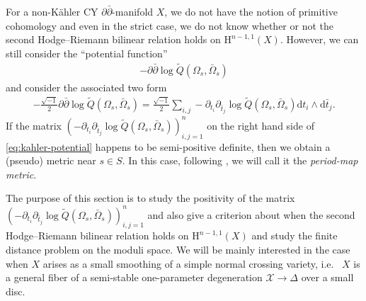 For a non-K\"{a}hler CY \(\partial\bar{\partial}\)-manifold \(X\), we do not have 
the notion of primitive cohomology and even in the strict case, we do not know
whether or not the second Hodge--Riemann bilinear relation holds on 
\(\mathrm{H}^{n-1,1}(X)\). However, we can still consider the ``potential function''
\begin{eqnarray*}
-\partial\bar{\partial}\log \tilde{Q}(\Omega_{s},\bar{\Omega}_{s})
\end{eqnarray*} 
and consider the associated two form
\begin{eqnarray}
\label{eq:kahler-potential}
-\frac{\sqrt{-1}}{2}\partial\bar{\partial}\log \tilde{Q}(\Omega_{s},\bar{\Omega}_{s})
=\frac{\sqrt{-1}}{2}
\sum_{i,j}-\partial_{t_{i}}\partial_{\bar{t}_{j}}
\log \tilde{Q}(\Omega_{s},\bar{\Omega}_{s})\mathrm{d}t_{i}\wedge\mathrm{d}\bar{t}_{j}.
\end{eqnarray}
If the matrix \((-\partial_{t_{i}}\partial_{\bar{t}_{j}}
\log \tilde{Q}(\Omega_{s},\bar{\Omega}_{s}))_{i,j=1}^{n}\)
on the right hand side of \eqref{eq:kahler-potential}
happens to be semi-positive definite, then we obtain a
(pseudo) metric near \(s\in S\).
In this case, following 
\cite{2019-Popovici-holomorphic-deformations-of-balanced-calabi-yau-d-dbar-manifolds},
we will call it the \emph{period-map metric}.

The purpose of this section is to
study the positivity of the matrix 
\((-\partial_{t_{i}}\partial_{\bar{t}_{j}}
\log \tilde{Q}(\Omega_{s},\bar{\Omega}_{s}))_{i,j=1}^{n}\)
and also give a criterion about 
when the second Hodge--Riemann 
bilinear relation holds on \(\mathrm{H}^{n-1,1}(X)\)
and study the finite distance problem on the moduli space.
We will be mainly interested in the case when \(X\) arises
as a small smoothing of a simple normal crossing variety, i.e.~
\(X\) is a general fiber of a semi-stable one-parameter degeneration 
\(\mathcal{X}\to\Delta\) over a small disc.


